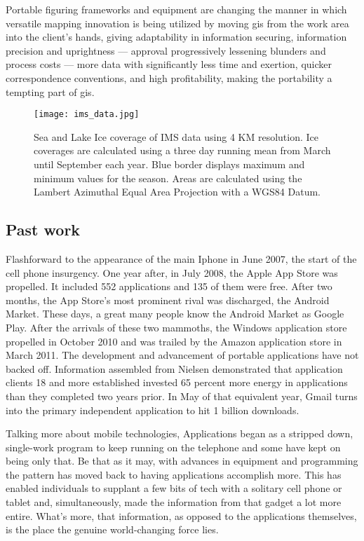 Portable figuring frameworks and equipment are changing the manner in which versatile mapping innovation is being utilized by moving \gls{gis} from the work area into the client's hands, giving adaptability in information securing, information precision and uprightness — approval progressively lessening blunders and process costs — more data with significantly less time and exertion, quicker correspondence conventions, and high profitability, making the portability a tempting part of \gls{gis}.

%
\begin{figure}[ht]
  \centering
  \begin{minipage}{4.5in}
    \texttt{[image: ims\_data.jpg]}
    \caption{ \label{fig:nat_ice} Sea and Lake Ice coverage of IMS data using 4 KM resolution. Ice coverages are calculated using a three day running mean from March until September each year. Blue border displays maximum and minimum values for the season. Areas are calculated using the Lambert Azimuthal Equal Area Projection with a WGS84 Datum. \cite{nat_ice}}
  \end{minipage}
\end{figure}
%

\subsection{Past work}

Flashforward to the appearance of the main Iphone in June 2007, the start of the cell phone insurgency. One year after, in July 2008, the Apple App Store was propelled. It included 552 applications and 135 of them were free. After two months, the App Store's most prominent rival was discharged, the Android Market. These days, a great many people know the Android Market as Google Play. After the arrivals of these two mammoths, the Windows application store propelled in October 2010 and was trailed by the Amazon application store in March 2011. The development and advancement of portable applications have not backed off. Information assembled from Nielsen demonstrated that application clients 18 and more established invested 65 percent more energy in applications than they completed two years prior. In May of that equivalent year, Gmail turns into the primary independent application to hit 1 billion downloads.

Talking more about mobile technologies, Applications began as a stripped down, single-work program to keep running on the telephone and some have kept on being only that. Be that as it may, with advances in equipment and programming the pattern has moved back to having applications accomplish more. This has enabled individuals to supplant a few bits of tech with a solitary cell phone or tablet and, simultaneously, made the information from that gadget a lot more entire. What's more, that information, as opposed to the applications themselves, is the place the genuine world-changing force lies.

